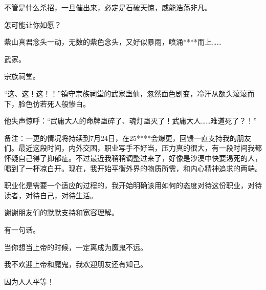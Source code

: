 \begin{this_body}
不管是什么杀招，一旦催出来，必定是石破天惊，威能浩荡非凡。

怎可能让你如愿？

紫山真君念头一动，无数的紫色念头，又好似暴雨，喷涌****而上……

武家。

宗族祠堂。

“这、这！这！！”镇守宗族祠堂的武家蛊仙，忽然面色剧变，冷汗从额头滚滚而下，脸色仿若死人般惨白。

他失声惊呼：“武庸大人的命牌蛊碎了、魂灯蛊灭了！武庸大人……难道死了？！”

备注：一更的情况将持续到7月24日，在25****会爆更，回馈一直支持我的朋友们。最近这段时间，内外交困，职业写手不好当，压力真的很大，有一段时间我都怀疑自己得了抑郁症。不过最近我稍稍调整过来了，好像是沙漠中快要渴死的人，喝到了一杯凉白开。现在，我开始平衡外界的物质所需，和内心精神追求的两端。

职业化是需要一个适应的过程的，我开始明确该用如何的态度对待这份职业，对待读者，对待自己，对待生活。

谢谢朋友们的默默支持和宽容理解。

有一句话。

当你想当上帝的时候，一定离成为魔鬼不远。

我不欢迎上帝和魔鬼，我欢迎朋友还有知己。

因为人人平等！

\end{this_body}

